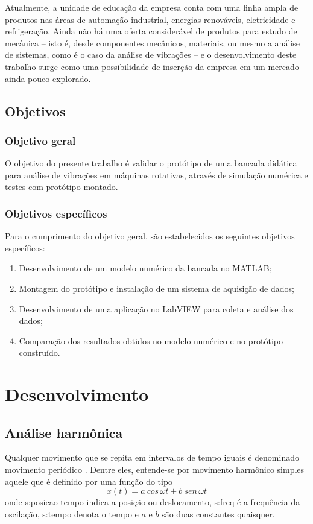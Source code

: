 \documentclass[12pt,openright,oneside,a4paper,
	chapter=TITLE,section=TITLE,
	english,brazil]{abntex2}
\begin{document}
	Atualmente, a unidade de educação da empresa conta com uma linha ampla de produtos nas áreas de automação industrial, energias renováveis, eletricidade e refrigeração. Ainda não há uma oferta considerável de produtos para estudo de mecânica -- isto é, desde componentes mecânicos, materiais, ou mesmo a análise de sistemas, como é o caso da análise de vibrações -- e o desenvolvimento deste trabalho surge como uma possibilidade de inserção da empresa em um mercado ainda pouco explorado.
	
	\section{Objetivos}
	
	\subsection{Objetivo geral}
	O objetivo do presente trabalho é validar o protótipo de uma bancada didática para análise de vibrações em máquinas rotativas, através de simulação numérica e testes com protótipo montado.
	
	\subsection{Objetivos específicos}
	Para o cumprimento do objetivo geral, são estabelecidos os seguintes objetivos específicos:
	\begin{enumerate}
		\setlength{\itemsep}{0pt plus 2pt minus 1pt}
		\item Desenvolvimento de um modelo numérico da bancada no MATLAB\textsuperscript{\textregistered};
		\item Montagem do protótipo e instalação de um sistema de aquisição de dados;
		\item Desenvolvimento de uma aplicação no LabVIEW\textsuperscript{\textregistered} para coleta e análise dos dados;
		\item Comparação dos resultados obtidos no modelo numérico e no protótipo construído.
	\end{enumerate}

	\chapter{Desenvolvimento}
	\section{Análise harmônica}
	Qualquer movimento que se repita em intervalos de tempo iguais é denominado movimento periódico \cite{rao:2008}. Dentre eles, entende-se por movimento harmônico simples aquele que é definido por uma função do tipo \cite{timoshenko:1974}
	\begin{equation}
		x(t) = a\ cos\,\omega t + b\ sen\,\omega t
	\end{equation}
	onde \gls{s:posicao-tempo} indica a posição ou deslocamento, \gls{s:freq} é a frequência da oscilação, \gls{s:tempo} denota o tempo e $ a $ e $ b $ são duas constantes quaisquer.
	
\end{document}
